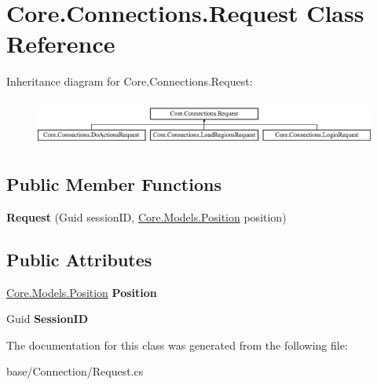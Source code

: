 \hypertarget{classCore_1_1Connections_1_1Request}{\section{Core.\-Connections.\-Request Class Reference}
\label{classCore_1_1Connections_1_1Request}
}
Inheritance diagram for Core.\-Connections.\-Request\-:\begin{figure}[H]
\begin{center}
\leavevmode
\includegraphics[height=1.536351cm]{classCore_1_1Connections_1_1Request}
\end{center}
\end{figure}
\subsection*{Public Member Functions}
\begin{DoxyCompactItemize}
\item 
\hypertarget{classCore_1_1Connections_1_1Request_a36b5ac4c812551bebd3310f1f54bb79e}{{\bfseries Request} (Guid session\-I\-D, \hyperlink{classCore_1_1Models_1_1Position}{Core.\-Models.\-Position} position)}\label{classCore_1_1Connections_1_1Request_a36b5ac4c812551bebd3310f1f54bb79e}

\end{DoxyCompactItemize}
\subsection*{Public Attributes}
\begin{DoxyCompactItemize}
\item 
\hypertarget{classCore_1_1Connections_1_1Request_a1aaa165e5028fe5a7baab44d6306cbee}{\hyperlink{classCore_1_1Models_1_1Position}{Core.\-Models.\-Position} {\bfseries Position}}\label{classCore_1_1Connections_1_1Request_a1aaa165e5028fe5a7baab44d6306cbee}

\item 
\hypertarget{classCore_1_1Connections_1_1Request_a19082721a0c3785a77691cb3bec7dd42}{Guid {\bfseries Session\-I\-D}}\label{classCore_1_1Connections_1_1Request_a19082721a0c3785a77691cb3bec7dd42}

\end{DoxyCompactItemize}


The documentation for this class was generated from the following file\-:\begin{DoxyCompactItemize}
\item 
base/\-Connection/Request.\-cs\end{DoxyCompactItemize}
